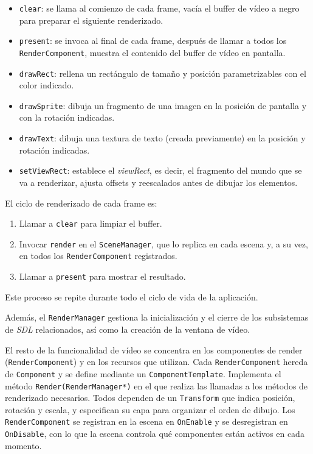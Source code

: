 \begin{itemize}
	\item \texttt{clear}: se llama al comienzo de cada frame, vacía el buffer de vídeo a negro para preparar el siguiente renderizado.
	\item \texttt{present}: se invoca al final de cada frame, después de llamar a todos los \texttt{RenderComponent}, muestra el contenido del buffer de vídeo en pantalla.
	\item \texttt{drawRect}: rellena un rectángulo de tamaño y posición parametrizables con el color indicado.
	\item \texttt{drawSprite}: dibuja un fragmento de una imagen en la posición de pantalla y con la rotación indicadas.
	\item \texttt{drawText}: dibuja una textura de texto (creada previamente) en la posición y rotación indicadas. 
	\item \texttt{setViewRect}: establece el \textit{viewRect}, es decir, el fragmento del mundo que se va a renderizar, ajusta offsets y reescalados antes de dibujar los elementos. 
\end{itemize}

El ciclo de renderizado de cada frame es: 
\begin{enumerate}
	\item Llamar a \texttt{clear} para limpiar el buffer.
	\item Invocar \texttt{render} en el \texttt{SceneManager}, que lo replica en cada escena y, a su vez, en todos los \texttt{RenderComponent} registrados. 
	\item Llamar a \texttt{present} para mostrar el resultado.
\end{enumerate}

Este proceso se repite durante todo el ciclo de vida de la aplicación.

\medskip

Además, el \texttt{RenderManager} gestiona la inicialización y el cierre de los subsistemas de \textit{SDL} relacionados, así como la creación de la ventana de vídeo.

\medskip

El resto de la funcionalidad de vídeo se concentra en los componentes de render (\texttt{RenderComponent}) y en los recursos que utilizan. Cada \texttt{RenderComponent} hereda de \texttt{Component} y se define mediante un \texttt{ComponentTemplate}. Implementa el método \texttt{Render(RenderManager*)} en el que realiza las llamadas a los métodos de renderizado necesarios. Todos dependen de un \texttt{Transform} que indica posición, rotación y escala, y especifican su capa para organizar el orden de dibujo. Los \texttt{RenderComponent} se registran en la escena en \texttt{OnEnable} y se desregistran en \texttt{OnDisable}, con lo que la escena controla qué componentes están activos en cada momento.  

